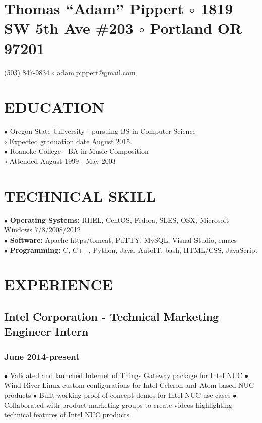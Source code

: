 \documentclass{article}
\begin{document}
\section*{Thomas ``Adam'' Pippert $\circ$
1819 SW 5th Ave \#203 $\circ$
Portland OR 97201}
\href{tel:+15038479834}{(503) 847-9834} $\circ$
\href{mailto:adam.pippert@gmail.com}{adam.pippert@gmail.com}

\section*{EDUCATION}

$\bullet$ Oregon State University - pursuing BS in Computer Science\\
$  \circ$ Expected graduation date August 2015.\\
$\bullet$ Roanoke College - BA in Music Composition\\
$  \circ$ Attended August 1999 - May 2003\\

\section*{TECHNICAL SKILL}

$\bullet$ \textbf{Operating Systems:} RHEL, CentOS, Fedora, SLES, OSX, Microsoft Windows 7/8/2008/2012\\
$\bullet$ \textbf{Software:} Apache https/tomcat, PuTTY, MySQL, Visual Studio, emacs\\
$\bullet$ \textbf{Programming:} C, C++, Python, Java, AutoIT, bash, HTML/CSS, JavaScript\\

\section*{EXPERIENCE}

\subsection*{Intel Corporation - Technical Marketing Engineer Intern}
\subsubsection*{June 2014-present}

$\bullet$ Validated and launched Internet of Things Gateway package for Intel NUC
$\bullet$ Wind River Linux custom configurations for Intel Celeron and Atom based NUC products
$\bullet$ Built working proof of concept demos for Intel NUC use cases 
$\bullet$ Collaborated with product marketing groups to create videos highlighting technical features of Intel NUC products
\end{document}
